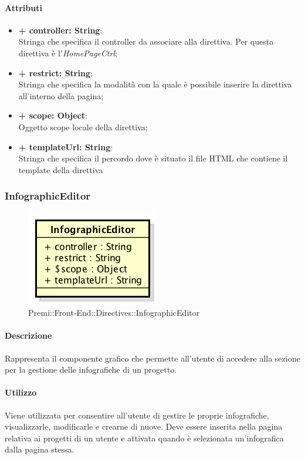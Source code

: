 	\paragraph{Attributi}
	\begin{itemize}
		\item \textbf{+ controller: String}:\\
			Stringa che specifica il controller da associare alla direttiva. Per questa direttiva è l'\textit{HomePageCtrl};
		\item \textbf{+ restrict: String}:\\
			Stringa che specifica la modalità con la quale è possibile inserire la direttiva all'interno della pagina;
		\item \textbf{+ scope: Object}:\\
			Oggetto scope locale della direttiva;
		\item \textbf{+ templateUrl: String}:\\
			Stringa che specifica il percordo dove è situato il file \gls{HTML} che contiene il \gls{template} della direttiva
	\end{itemize}
\newpage
	
	
\subsubsection{InfographicEditor}
	\begin{figure}[h]
		\centering
		\includegraphics[width=0.4\linewidth]{img/premi_front_end_directives_infographiceditor}
		\caption[Premi::Front-End::Directives::InfographicEditor]{Premi::Front-End::Directives::InfographicEditor}
	\end{figure}
	
	\paragraph{Descrizione}
		Rappresenta il componente grafico che permette all'utente di accedere alla sezione per la gestione delle infografiche di un progetto.
	
	\paragraph{Utilizzo}
	Viene utilizzata per consentire all'utente di gestire le proprie infografiche, visualizzarle, modificarle e crearne di nuove. Deve essere inserita nella pagina relativa ai progetti di un utente e attivata quando è selezionata un'\gls{infografica} dalla pagina stessa.
	
